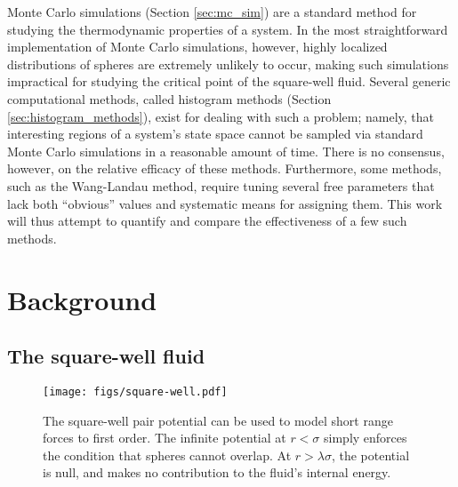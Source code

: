 \documentclass[11pt]{article}
\begin{document}
Monte Carlo simulations (Section \ref{sec:mc_sim}) are a standard
method for studying the thermodynamic properties of a system. In the
most straightforward implementation of Monte Carlo simulations,
however, highly localized distributions of spheres are extremely
unlikely to occur, making such simulations impractical for studying
the critical point of the square-well fluid. Several generic
computational methods, called histogram methods (Section
\ref{sec:histogram_methods}), exist for dealing with such a problem;
namely, that interesting regions of a system's state space cannot be
sampled via standard Monte Carlo simulations in a reasonable amount of
time. There is no consensus, however, on the relative efficacy of
these methods. Furthermore, some methods, such as the Wang-Landau
method\cite{wang_landau}, require tuning several free parameters that
lack both ``obvious'' values and systematic means for assigning
them. This work will thus attempt to quantify and compare the
effectiveness of a few such methods.


\section{Background}
\label{sec:background}

\subsection{The square-well fluid}
\label{sec:sw_fluid}

\begin{figure}[tb]
  \centering
  \texttt{[image: figs/square-well.pdf]}
  \caption[The square-well pair potential]{The square-well pair
    potential can be used to model short range forces to first
    order. The infinite potential at $r<\sigma$ simply enforces the
    condition that spheres cannot overlap. At $r>\lambda\sigma$, the
    potential is null, and makes no contribution to the fluid's
    internal energy.}
  \label{fig:pair_potential}
\end{figure}
\end{document}
